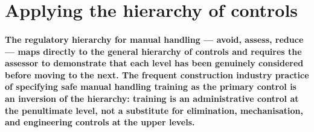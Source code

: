\section{Applying the hierarchy of controls}

\paragraph{The regulatory hierarchy for manual handling --- avoid, assess, reduce --- maps directly to the general hierarchy of controls and requires the assessor to demonstrate that each level has been genuinely considered before moving to the next. The frequent construction industry practice of specifying safe manual handling training as the primary control is an inversion of the hierarchy: training is an administrative control at the penultimate level, not a substitute for elimination, mechanisation, and engineering controls at the upper levels.}

